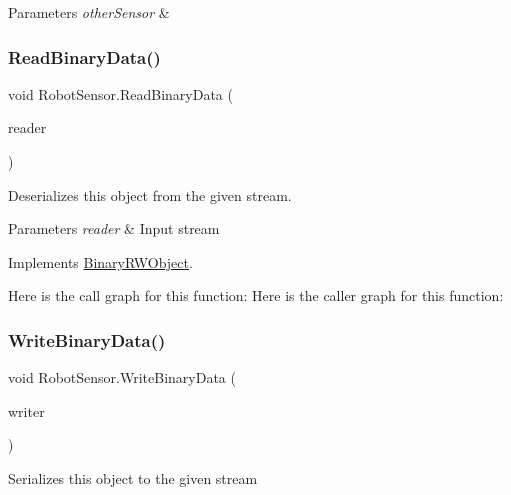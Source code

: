 \begin{DoxyParams}{Parameters}
{\em other\+Sensor} & \\
\hline
\end{DoxyParams}
\mbox{\label{class_robot_sensor_ad847a256a5f297a3d4b1570a3ccbd97a}} 
\subsubsection{\texorpdfstring{Read\+Binary\+Data()}{ReadBinaryData()}}
{\footnotesize\ttfamily void Robot\+Sensor.\+Read\+Binary\+Data (\begin{DoxyParamCaption}\item[{Binary\+Reader}]{reader }\end{DoxyParamCaption})}



Deserializes this object from the given stream. 


\begin{DoxyParams}{Parameters}
{\em reader} & Input stream\\
\hline
\end{DoxyParams}


Implements \hyperlink{interface_binary_r_w_object_a2cd7d6b9aded677cffdb646b51328c5d}{Binary\+R\+W\+Object}.

Here is the call graph for this function\+:
Here is the caller graph for this function\+:
\mbox{\label{class_robot_sensor_aa1dc17e6028128cabb1ddbfdb1334b84}} 
\subsubsection{\texorpdfstring{Write\+Binary\+Data()}{WriteBinaryData()}}
{\footnotesize\ttfamily void Robot\+Sensor.\+Write\+Binary\+Data (\begin{DoxyParamCaption}\item[{Binary\+Writer}]{writer }\end{DoxyParamCaption})}



Serializes this object to the given stream 


